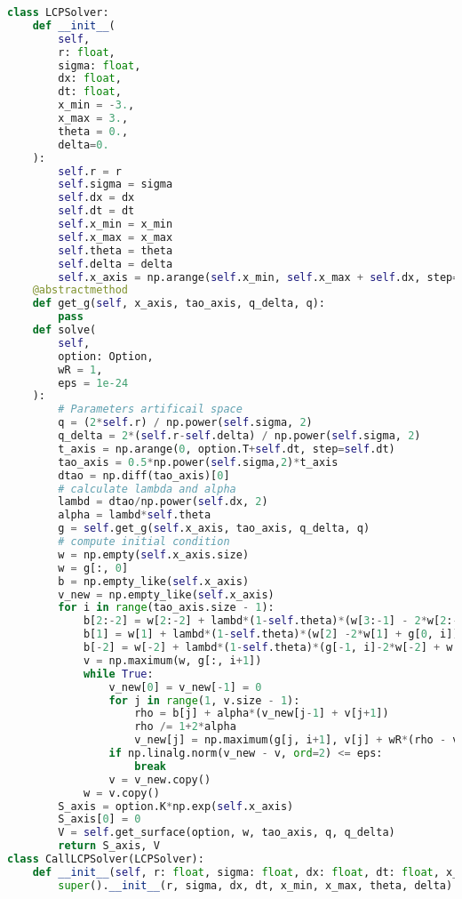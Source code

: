 \begin{lstlisting}[language=Python, caption=PSOR-LCP solver for Company transformation.]
class LCPSolver:
    def __init__(
        self,
        r: float, 
        sigma: float, 
        dx: float, 
        dt: float,
        x_min = -3.,
        x_max = 3.,
        theta = 0., 
        delta=0.
    ):
        self.r = r
        self.sigma = sigma
        self.dx = dx
        self.dt = dt
        self.x_min = x_min
        self.x_max = x_max
        self.theta = theta
        self.delta = delta
        self.x_axis = np.arange(self.x_min, self.x_max + self.dx, step=self.dx)
    @abstractmethod
    def get_g(self, x_axis, tao_axis, q_delta, q):
        pass
    def solve(
        self,
        option: Option,
        wR = 1,
        eps = 1e-24
    ):
        # Parameters artificail space
        q = (2*self.r) / np.power(self.sigma, 2)
        q_delta = 2*(self.r-self.delta) / np.power(self.sigma, 2)
        t_axis = np.arange(0, option.T+self.dt, step=self.dt)
        tao_axis = 0.5*np.power(self.sigma,2)*t_axis
        dtao = np.diff(tao_axis)[0]
        # calculate lambda and alpha
        lambd = dtao/np.power(self.dx, 2)
        alpha = lambd*self.theta
        g = self.get_g(self.x_axis, tao_axis, q_delta, q)
        # compute initial condition
        w = np.empty(self.x_axis.size)
        w = g[:, 0]
        b = np.empty_like(self.x_axis)
        v_new = np.empty_like(self.x_axis)
        for i in range(tao_axis.size - 1):
            b[2:-2] = w[2:-2] + lambd*(1-self.theta)*(w[3:-1] - 2*w[2:-2] + w[1:-3])
            b[1] = w[1] + lambd*(1-self.theta)*(w[2] -2*w[1] + g[0, i]) + alpha*g[0, i+1]
            b[-2] = w[-2] + lambd*(1-self.theta)*(g[-1, i]-2*w[-2] + w[-3]) + alpha*g[-1, i+1]
            v = np.maximum(w, g[:, i+1])
            while True:
                v_new[0] = v_new[-1] = 0
                for j in range(1, v.size - 1):
                    rho = b[j] + alpha*(v_new[j-1] + v[j+1])
                    rho /= 1+2*alpha
                    v_new[j] = np.maximum(g[j, i+1], v[j] + wR*(rho - v[j]))
                if np.linalg.norm(v_new - v, ord=2) <= eps:
                    break
                v = v_new.copy()
            w = v.copy()
        S_axis = option.K*np.exp(self.x_axis)
        S_axis[0] = 0
        V = self.get_surface(option, w, tao_axis, q, q_delta)
        return S_axis, V
class CallLCPSolver(LCPSolver):
    def __init__(self, r: float, sigma: float, dx: float, dt: float, x_min=-3, x_max=3, theta=0, delta=0):
        super().__init__(r, sigma, dx, dt, x_min, x_max, theta, delta)

\end{lstlisting}
